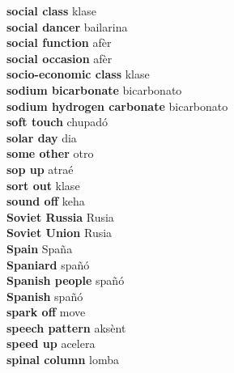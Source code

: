 \textbf{ social class  } klase \\
\textbf{ social dancer  } bailarina \\
\textbf{ social function  } afèr \\
\textbf{ social occasion  } afèr \\
\textbf{ socio-economic class  } klase \\
\textbf{ sodium bicarbonate  } bicarbonato \\
\textbf{ sodium hydrogen carbonate  } bicarbonato \\
\textbf{ soft touch  } chupadó \\
\textbf{ solar day  } dia \\
\textbf{ some other  } otro \\
\textbf{ sop up  } atraé \\
\textbf{ sort out  } klase \\
\textbf{ sound off  } keha \\
\textbf{ Soviet Russia  } Rusia \\
\textbf{ Soviet Union  } Rusia \\
\textbf{ Spain  } Spaña \\
\textbf{ Spaniard  } spañó \\
\textbf{ Spanish people  } spañó \\
\textbf{ Spanish  } spañó \\
\textbf{ spark off  } move \\
\textbf{ speech pattern  } aksènt \\
\textbf{ speed up  } acelera \\
\textbf{ spinal column  } lomba \\
